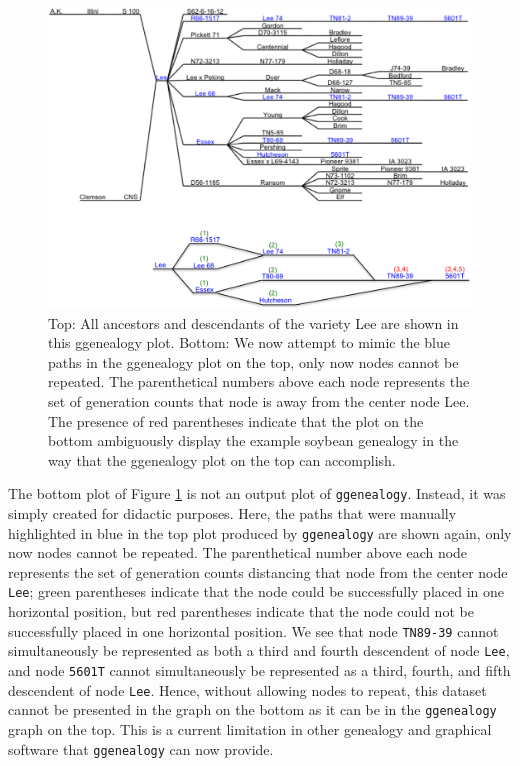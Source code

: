 \documentclass[11pt,a4paper,oldfontcommands,openany]{memoir}
\numberwithin{equation}{section} %
\newcommand{\code}[1]{{\texttt{#1}}}
\newcommand{\pkg}[1]{{\texttt{#1}}}
\begin{document}
\begin{figure}[H]
    \centering
    \includegraphics[width=\textwidth]{LeeAD3}
    \caption{Top: All ancestors and descendants of the variety Lee are shown in this ggenealogy plot. Bottom: We now attempt to mimic the blue paths in the ggenealogy plot on the top, only now nodes cannot be repeated. The parenthetical numbers above each node represents the set of generation counts that node is away from the center node Lee. The presence of red parentheses indicate that the plot on the bottom ambiguously display the example soybean genealogy in the way that the ggenealogy plot on the top can accomplish.}
    \label{fig:Lee}
\end{figure}

The bottom plot of Figure \ref{fig:Lee} is not an output plot of \pkg{ggenealogy}. Instead, it was simply created for didactic purposes. Here, the paths that were manually highlighted in blue in the top plot produced by \pkg{ggenealogy} are shown again, only now nodes cannot be repeated. The parenthetical number above each node represents the set of generation counts distancing that node from the center node \code{Lee}; green parentheses indicate that the node could be successfully placed in one horizontal position, but red parentheses indicate that the node could not be successfully placed in one horizontal position. We see that node \code{TN89-39} cannot simultaneously be represented as both a third and fourth descendent of node \code{Lee}, and node \code{5601T} cannot simultaneously be represented as a third, fourth, and fifth descendent of node \code{Lee}. Hence, without allowing nodes to repeat, this dataset cannot be presented in the graph on the bottom as it can be in the \pkg{ggenealogy} graph on the top. This is a current limitation in other genealogy and graphical software that \pkg{ggenealogy} can now provide.
\end{document}
